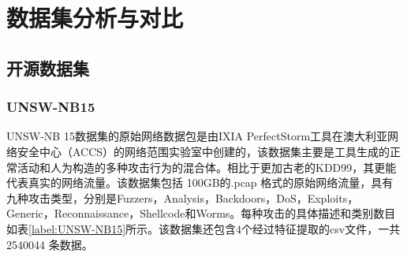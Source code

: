 
\chapter{数据集分析与对比}
\section{开源数据集}
\subsection{UNSW-NB15}
UNSW-NB 15数据集\cite{moustafa2015unsw}的原始网络数据包是由IXIA PerfectStorm工具在澳大利亚网络安全中心（ACCS）的网络范围实验室中创建的，该数据集主要是工具生成的正常活动和人为构造的多种攻击行为的混合体。相比于更加古老的KDD99\cite{ozgur2016review}，其更能代表真实的网络流量。该数据集包括 100GB的.pcap 格式的原始网络流量，具有九种攻击类型，分别是Fuzzers，Analysis，Backdoors，DoS，Exploits，Generic，Reconnaissance，Shellcode和Worms。每种攻击的具体描述和类别数目如表\ref{label:UNSW-NB15}所示。该数据集还包含4个经过特征提取的csv文件，一共2540044 条数据。




